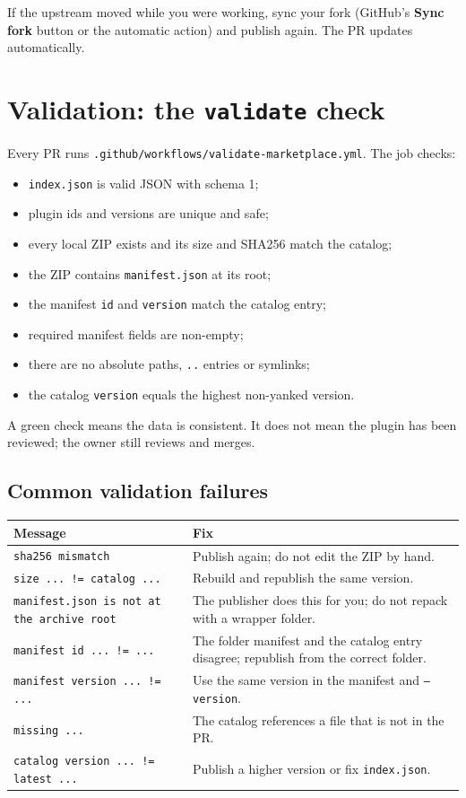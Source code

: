 \documentclass[11pt,a4paper]{article}
\newcommand{\code}[1]{\texttt{#1}}
\begin{document}
If the upstream moved while you were working, sync your fork (GitHub's
\textbf{Sync fork} button or the automatic action) and publish again. The PR
updates automatically.

\section{Validation: the \code{validate} check}

Every PR runs \code{.github/workflows/validate-marketplace.yml}. The job checks:

\begin{itemize}[leftmargin=1.5em]
  \item \code{index.json} is valid JSON with schema 1;
  \item plugin ids and versions are unique and safe;
  \item every local ZIP exists and its size and SHA256 match the catalog;
  \item the ZIP contains \code{manifest.json} at its root;
  \item the manifest \code{id} and \code{version} match the catalog entry;
  \item required manifest fields are non-empty;
  \item there are no absolute paths, \code{..} entries or symlinks;
  \item the catalog \code{version} equals the highest non-yanked version.
\end{itemize}

A green check means the data is consistent. It does not mean the plugin has been
reviewed; the owner still reviews and merges.

\subsection{Common validation failures}

\begin{center}
\begin{longtable}{@{}p{6.2cm}p{9.2cm}@{}}
\toprule
Message & Fix \\
\midrule
\code{sha256 mismatch} & Publish again; do not edit the ZIP by hand. \\
\code{size ... != catalog ...} & Rebuild and republish the same version. \\
\code{manifest.json is not at the archive root} & The publisher does this for you; do not repack with a wrapper folder. \\
\code{manifest id ... != ...} & The folder manifest and the catalog entry disagree; republish from the correct folder. \\
\code{manifest version ... != ...} & Use the same version in the manifest and \code{--version}. \\
\code{missing ...} & The catalog references a file that is not in the PR. \\
\code{catalog version ... != latest ...} & Publish a higher version or fix \code{index.json}. \\
\bottomrule
\end{longtable}
\end{center}
\end{document}
